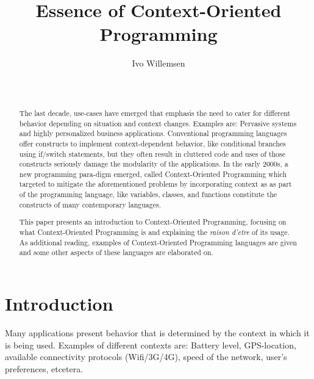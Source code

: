 \documentclass{acm_proc_article-sp}
\begin{document}
\title{Essence of Context-Oriented Programming}

\author{
\alignauthor
Ivo Willemsen\\
       \\
       \\
}

\maketitle
\begin{abstract}
The last decade, use-cases have emerged that emphasis the need to cater for different behavior depending on situation and context changes. Examples are: Pervasive systems \cite{pervasivecomputing} and highly personalized business applications. Conventional programming languages offer constructs to implement context-dependent behavior, like  conditional branches using if/switch statements, but they often result in cluttered code and uses of those 
constructs seriously damage the modularity of the applications. In the early 2000s, a new programming para-\linebreak digm emerged, called Context-Oriented Programming which targeted to mitigate the aforementioned problems by incorporating context as as part of the programming language, like variables, classes, and functions constitute the constructs 
of many contemporary languages.

This paper presents an introduction to Context-Oriented Programming, focusing on what Context-Oriented Programming is and explaining the \textit{raison d'etre} of its usage. As additional reading, examples of Context-Oriented Programming languages are given and some other aspects of these languages are elaborated on.  
\end{abstract}


\section{Introduction} \label{introduction}
Many applications present behavior that is determined by the context in which it is being used. Examples of different contexts are: Battery level, GPS-location, available connectivity protocols (Wifi/3G/4G), speed of the network, user's preferences, etcetera.
\end{document}
